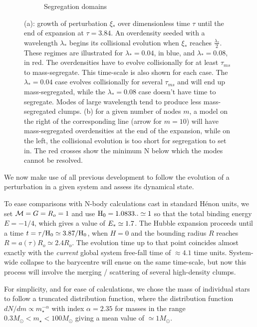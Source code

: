 \begin{figure}
\begin{subfigure}[b]{0.49\textwidth}
        \caption{Segregation domains}
        \label{Fig:1_segregation_zone}
    \end{subfigure}
\caption{(a): growth of perturbation $\xi_*$ over dimensionless time $\tau$ until the end of expansion at $\tau = 3.84$. An overdensity seeded with a wavelength $\lambda_*$ begins its collisional evolution when $\xi_*$ reaches $\frac{\lambda_*}{2}$. These regimes are illustrated for $\lambda_* =0.04$, in blue, and  $\lambda_* =0.08$, in red. The overdensities have to evolve collisionally for at least $\tau_{ms}$ to mass-segregate. This time-scale is also shown for each case. The $\lambda_* =0.04$  case evolves collisionally for several $\tau_{ms}$ and will end up mass-segregated, while the $\lambda_* =0.08$ case doesn't have time to segregate. Modes of large wavelength tend to produce less mass-segregated clumps. (b) for a given number of nodes $m$, a model on the right of the corresponding line (arrow for $m=10$) will have mass-segregated overdensities at the end of the expansion, while on the left, the collisional evolution is too short for segregation to set in. The red crosses show the minimum N below which the modes cannot be resolved.} 
\label{Fig:0_perturbation_growth}
\end{figure}


We now make use of all previous development to follow the evolution of a perturbation in a given system and assess its dynamical state.

To ease comparisons with N-body calculations cast in standard H\'enon units, we set ${\cal M} = G = R_o = 1 $ and use ${\textrm{H}}_0 = 1.0833 .. \simeq 1$ so that the total binding energy $E = -1/4$, which gives a value of $E_\ast \simeq 1.7$. The Hubble expansion proceeds until a time $t = \tau / {\textrm{H}}_0 \simeq 3.87 / {\textrm{H}}_0$, when $H = 0$ and the bounding radius $R$ reaches $R = a(\tau)R_o \simeq 2.4 R_o$. The evolution time up to that point coincides almost exactly with the {\it current} global system free-fall time of $\approx 4.1$ time units. System-wide collapse to the barycentre will ensue on the same time-scale, but now this process will involve the merging / scattering of several high-density clumps. 

For simplicity, and for ease of calculations, we chose the mass of individual stars to follow a  truncated \cite{Salpeter1955} distribution function, where the distribution function $ dN/dm \propto m_\star^{-\alpha}$ with index $\alpha = 2.35$ for masses in the range  $0.3 M_\odot < m_\star < 100 M_\odot$ giving a mean value of $\simeq 1 M_\odot$.


